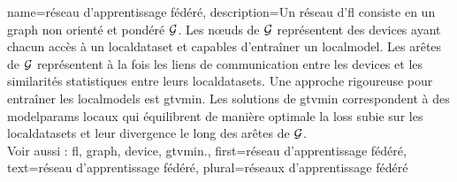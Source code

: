 {name={réseau d’apprentissage fédéré},
	description={Un réseau d'\gls{fl} consiste en un 
		\gls{graph} non orienté et pondéré $\mathcal{G}$. Les nœuds de $\mathcal{G}$ représentent des \glspl{device} 
		ayant chacun accès à un \gls{localdataset} et capables d’entraîner un \gls{localmodel}. Les arêtes de $\mathcal{G}$ 
		représentent à la fois les liens de communication entre les \glspl{device} et les similarités statistiques 
		entre leurs \glspl{localdataset}. Une approche rigoureuse pour entraîner les \glspl{localmodel} est 
		\gls{gtvmin}. Les solutions de \gls{gtvmin} correspondent à des \gls{modelparams} locaux qui équilibrent 
		de manière optimale la \gls{loss} subie sur les \glspl{localdataset} et leur divergence le long des arêtes de $\mathcal{G}$.
		\\
		Voir aussi : \gls{fl}, \gls{graph}, \gls{device}, \gls{gtvmin}.},
	first={réseau d’apprentissage fédéré},
	text={réseau d'apprentissage fédéré}, plural={réseaux d'apprentissage fédéré}
}


